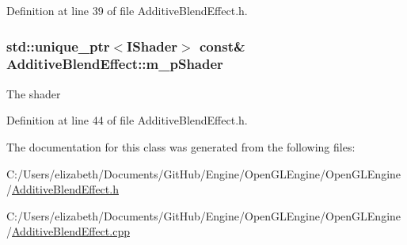Definition at line 39 of file Additive\+Blend\+Effect.\+h.

\subsubsection[{\texorpdfstring{m\+\_\+p\+Shader}{m_pShader}}]{\setlength{\rightskip}{0pt plus 5cm}std\+::unique\+\_\+ptr$<${\bf I\+Shader}$>$ const\& Additive\+Blend\+Effect\+::m\+\_\+p\+Shader\hspace{0.3cm}{\ttfamily [private]}}\hypertarget{class_additive_blend_effect_a5f25db987222e0f6cefb14116da373e9}{}\label{class_additive_blend_effect_a5f25db987222e0f6cefb14116da373e9}


The shader 



Definition at line 44 of file Additive\+Blend\+Effect.\+h.



The documentation for this class was generated from the following files\+:\begin{DoxyCompactItemize}
\item 
C\+:/\+Users/elizabeth/\+Documents/\+Git\+Hub/\+Engine/\+Open\+G\+L\+Engine/\+Open\+G\+L\+Engine/\hyperlink{_additive_blend_effect_8h}{Additive\+Blend\+Effect.\+h}\item 
C\+:/\+Users/elizabeth/\+Documents/\+Git\+Hub/\+Engine/\+Open\+G\+L\+Engine/\+Open\+G\+L\+Engine/\hyperlink{_additive_blend_effect_8cpp}{Additive\+Blend\+Effect.\+cpp}\end{DoxyCompactItemize}
